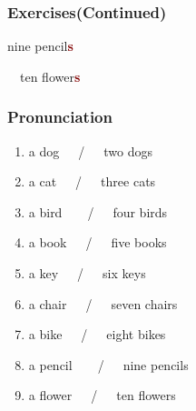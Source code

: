 \documentclass[aspectratio=169,xcolor={dvipsnames,table}]{beamer}
\newcommand{\myaudio}[1]{\href{#1}{\faVolumeUp}}
\begin{document}
\begin{frame}[plain]\frametitle{Exercises(Continued)}

\hspace{20pt}%
\pause
{}\hspace{15pt}
\pause

\mbox{}\hspace{.8\textwidth} {\large nine pencil\textcolor{Maroon}{\bfseries s}}
\pause

\bcfleur\,\,\,\,\hspace{45pt}%
\pause
\bcfleur\bcfleur\bcfleur\bcfleur\bcfleur\hspace{15pt}
\bcfleur\bcfleur\bcfleur\bcfleur\bcfleur\hspace{10pt}
\pause
{\large ten flower\textcolor{Maroon}{\bfseries s}}

\myaudio{./audio/005_singular_plural_03.mp3}
\end{frame}
\begin{frame}[plain]\frametitle{Pronunciation}

\begin{enumerate}
 \item a dog~~~/~~~two dogs%
\hfill{}\hspace{180pt}\mbox{}
 \item a cat~~~/~~~three cats%
\hfill{}\hspace{180pt}\mbox{}
 \item a bird~~~~/~~~four birds%
\hfill{}\hspace{180pt}\mbox{}
 \item a book~~~/~~~five books%
\hfill{}\hspace{180pt}\mbox{}
 \item a key~~~/~~~six keys%
\hfill{}\hspace{180pt}\mbox{}
 \item a chair~~~/~~~seven chairs%
\hfill{}\hspace{180pt}\mbox{}
 \item a bike~~~/~~~eight bikes%
\hfill{}\hspace{180pt}\mbox{}
 \item a pencil~~~~/~~~nine pencils%
\hfill{}\hspace{180pt}\mbox{}
 \item a flower~~~/~~~ten flowers%
\hfill{}\hspace{180pt}\mbox{}
\end{enumerate}

\pause
\mbox{}\hfill\myaudio{./audio/005_singular_plural_04.mp3}
\end{frame}
\end{document}
